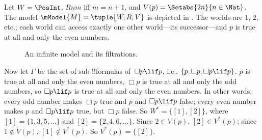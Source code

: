 \documentclass[../../../include/open-logic-section]{subfiles}
\begin{document}
\begin{ex}
  Let $W = \PosInt$, $Rnm$ iff $m = n + 1$, and $V(p) = \Setabs{2n}{n \in
    \Nat}$. The model $\mModel{M} = \tuple{W, R, V}$ is depicted in
  . The worlds are $1$, $2$, etc.; each
  world can access exactly one other world---its successor---and $p$ is
  true at all and only the even numbers.

  \begin{figure}
    \centering

    \caption{An infinite model and its filtrations.}
  \end{figure}
  
  Now let $\Gamma$ be the set of sub-!!{formula}s of~$\Box p \lif p$,
  i.e., $\{p, \Box p, \Box p \lif p\}$. $p$ is true at all and only
  the even numbers, $\Box p$ is true at all and only the odd numbers,
  so $\Box p \lif p$ is true at all and only the even numbers. In
  other words, every odd number makes $\Box p$ true and $p$ and $\Box
  p \lif p$ false; every even number makes $p$ and $\Box p \lif p$
  true, but $\Box p$ false. So $W^* = \{ [1], [2] \}$, where $[1] =
  \{1, 3, 5, \dots\}$ and $[2] = \{2, 4, 6, \dots\}$. Since $2 \in
  V(p)$, $[2] \in V^*(p)$; since $1 \notin V(p)$, $[1] \notin
  V^*(p)$. So $V^*(p) = \{[2]\}$.


\end{ex}
\end{document}
